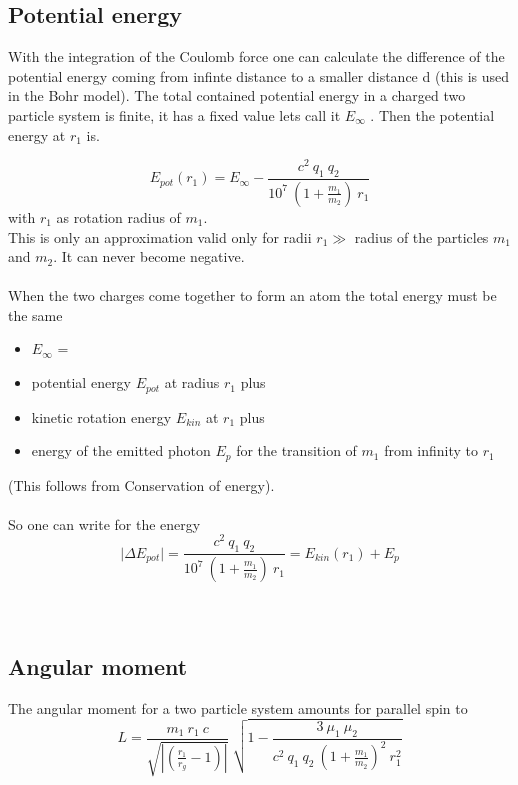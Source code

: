 \documentclass[10pt,titlepage]{article}
\begin{document}

\subsection{Potential energy}
With the integration of the Coulomb force one can calculate the difference of the potential energy coming from infinte distance to a smaller distance d (this is used in the Bohr model).
The total contained potential energy in a charged two particle system is finite, it has a fixed value lets call it $E_\infty$ . Then the potential energy at $r_1$ is.

\begin{equation} 
E_{pot}(r_1) = E_\infty - \frac{c^2 \ q_1 \ q_2}{10^7 \ (1+\frac{m_1}{m_2}) \ r_1}
\end{equation} 
with $r_1$ as rotation radius of $m_1$.
\\
This is only an approximation valid only for radii $r_1 \gg $ radius of the particles $m_1$ and $m_2$. It can never become negative.
\\\\
 When the two charges come together to form an atom the total energy must be the same
\begin{itemize}
	\item $E_\infty$ =
	\item potential energy $E_{pot}$ at radius $r_1$ plus
	\item kinetic rotation energy $E_{kin}$ at $r_1$ plus
	\item energy of the emitted photon $E_p$ for the transition of $m_1$ from infinity to $r_1$  
\end{itemize}   
(This follows from Conservation of energy).
\\\\
So one can write for the energy 
\begin{equation} 
\mid \Delta E_{pot} \mid =\frac{c^2 \ q_1 \ q_2}{10^7 \ (1+\frac{m_1}{m_2}) \ r_1}=E_{kin} (r_1) + E_p
\end{equation}
\\\\

\subsection{Angular moment}
The angular moment for a two particle system amounts for parallel spin to 
\\
\begin{equation}
 L=\frac{m_1 \ r_1 \ c}{\sqrt{|(\frac{r_1}{r_g}-1)|}} \ \sqrt{1-\frac{3 \ \mu_1 \ \mu_2}{c^2 \ q_1 \ q_2 \ (1+\frac{m_1}{m_2})^2 \ r_1^2}}\end{equation}
\\
\\
\end{document}
